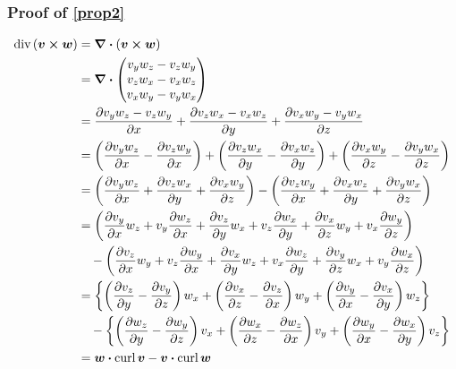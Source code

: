 \documentclass{article}
\renewcommand{\vec}[1]{\boldsymbol{#1}}
\begin{document}
\subsubsection{Proof of \eqref{prop2}}

\begin{align*}
    \text{div} \left( \vec{v} \cross \vec{w} \right) &= \div \left( \vec{v} \cross \vec{w} \right) \\
    &= \div \begin{pmatrix} v_y w_z - v_z w_y \\ v_z w_x - v_x w_z \\ v_x w_y - v_y w_x \end{pmatrix} \\
    &= \frac{\partial{ v_y w_z - v_z w_y }}{\partial{ x }} + \frac{\partial{ v_z w_x - v_x w_z }}{\partial{ y }} + \frac{\partial{ v_x w_y - v_y w_x }}{\partial{ z }} \\
    &= \left( \frac{\partial{ v_y w_z }}{\partial{ x }} - \frac{\partial{ v_z w_y }}{\partial{ x }} \right) + \left( \frac{\partial{ v_z w_x }}{\partial{ y }} - \frac{\partial{ v_x w_z }}{\partial{ y }} \right) + \left( \frac{\partial{ v_x w_y }}{\partial{ z }} - \frac{\partial{ v_y w_x }}{\partial{ z }} \right) \\
    &= \left( \frac{\partial{ v_y w_z }}{\partial{ x }} + \frac{\partial{ v_z w_x }}{\partial{ y }} + \frac{\partial{ v_x w_y }}{\partial{ z }} \right) - \left( \frac{\partial{ v_z w_y }}{\partial{ x }} + \frac{\partial{ v_x w_z }}{\partial{ y }} + \frac{\partial{ v_y w_x }}{\partial{ z }} \right) \\
    &=\left( \frac{\partial{ v_y }}{\partial{ x }} w_z + v_y \frac{\partial{ w_z }}{\partial{ x }} + \frac{\partial{ v_z }}{\partial{ y }} w_x + v_z \frac{\partial{ w_x }}{\partial{ y }} + \frac{\partial{ v_x }}{\partial{ z }} w_y + v_x \frac{\partial{ w_y }}{\partial{ z }} \right) \\
    &\quad - \left( \frac{\partial{ v_z }}{\partial{ x }} w_y + v_z \frac{\partial{ w_y }}{\partial{ x }} + \frac{\partial{ v_x }}{\partial{ y }} w_z + v_x \frac{\partial{ w_z }}{\partial{ y }} + \frac{\partial{ v_y }}{\partial{ z }} w_x + v_y \frac{\partial{ w_x }}{\partial{ z }} \right) \\
    &= \left\{ \left( \frac{\partial{ v_z }}{\partial{ y }} - \frac{\partial{ v_y }}{\partial{ z }} \right) w_x + \left( \frac{\partial{ v_x }}{\partial{ z }} - \frac{\partial{ v_z }}{\partial{ x }} \right) w_y + \left( \frac{\partial{ v_y }}{\partial{ x }} - \frac{\partial{ v_x }}{\partial{ y }} \right) w_z \right\} \\
    &\quad - \left\{ \left( \frac{\partial{ w_z }}{\partial{ y }} - \frac{\partial{ w_y }}{\partial{ z }} \right) v_x + \left( \frac{\partial{ w_x }}{\partial{ z }} - \frac{\partial{ w_z }}{\partial{ x }} \right) v_y + \left( \frac{\partial{ w_y }}{\partial{ x }} - \frac{\partial{ w_x }}{\partial{ y }} \right) v_z \right\} \\
    &= \vec{w} \vdot \text{curl} \, \vec{v} - \vec{v} \vdot \text{curl} \, \vec{w}
\end{align*}
\end{document}
